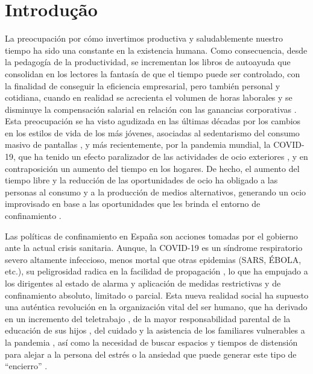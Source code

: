 \documentclass[spanish]{textolivre}
\begin{document}
\section{Introdução}\label{sec-intro}
La preocupación por cómo invertimos productiva y saludablemente nuestro tiempo ha sido una constante en la existencia humana. Como consecuencia, desde la pedagogía de la productividad, se incrementan los libros de autoayuda que consolidan en los lectores la fantasía de que el tiempo puede ser controlado, con la finalidad de conseguir la eficiencia empresarial, pero también personal y cotidiana, cuando en realidad se acrecienta el volumen de horas laborales y se disminuye la compensación salarial en relación con las ganancias corporativas \cite{gregg2018}. Esta preocupación se ha visto agudizada en las últimas décadas por los cambios en los estilos de vida de los más jóvenes, asociadas al sedentarismo del consumo masivo de pantallas \cite{wang2019}, y más recientemente, por la pandemia mundial, la COVID-19, que ha tenido un efecto paralizador de las actividades de ocio exteriores \cite{cencerradomalmierca2020}, y en contraposición un aumento del tiempo en los hogares. De hecho, el aumento del tiempo libre y la reducción de las oportunidades de ocio ha obligado a las personas al consumo y a la producción de medios alternativos, generando un ocio improvisado en base a las oportunidades que les brinda el entorno de confinamiento \cite{bond2020}.

Las políticas de confinamiento en España son acciones tomadas por el gobierno ante la actual crisis sanitaria. Aunque, la COVID-19 es un síndrome respiratorio severo altamente infeccioso, menos mortal que otras epidemias (SARS, ÉBOLA, etc.), su peligrosidad radica en la facilidad de propagación \cite{callaway2020}, lo que ha empujado a los dirigentes al estado de alarma y aplicación de medidas restrictivas y de confinamiento absoluto, limitado o parcial. Esta nueva realidad social ha supuesto una auténtica revolución en la organización vital del ser humano, que ha derivado en un incremento del teletrabajo \cite{santillan2020}, de la mayor responsabilidad parental de la educación de sus hijos \cite{moreno2020}, del cuidado y la asistencia de los familiares vulnerables a la pandemia \cite{rodriguezescanciano2020}, así como la necesidad de buscar espacios y tiempos de distensión para alejar a la persona del estrés o la ansiedad que puede generar este tipo de “encierro” \cite{ozamiz-etxebarria2020}. 
\end{document}
